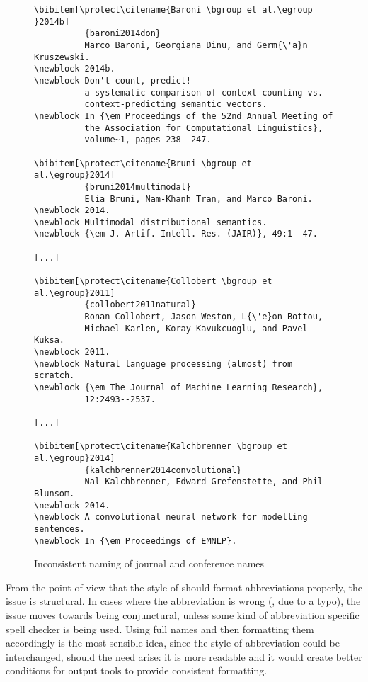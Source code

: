 \begin{figure}
  \centering
\begin{small}
\begin{verbatim}
\bibitem[\protect\citename{Baroni \bgroup et al.\egroup }2014b]
          {baroni2014don}
          Marco Baroni, Georgiana Dinu, and Germ{\'a}n Kruszewski.
\newblock 2014b.
\newblock Don't count, predict!
          a systematic comparison of context-counting vs.
          context-predicting semantic vectors.
\newblock In {\em Proceedings of the 52nd Annual Meeting of
          the Association for Computational Linguistics},
          volume~1, pages 238--247.

\bibitem[\protect\citename{Bruni \bgroup et al.\egroup}2014]
          {bruni2014multimodal}
          Elia Bruni, Nam-Khanh Tran, and Marco Baroni.
\newblock 2014.
\newblock Multimodal distributional semantics.
\newblock {\em J. Artif. Intell. Res. (JAIR)}, 49:1--47.

[...]

\bibitem[\protect\citename{Collobert \bgroup et al.\egroup}2011]
          {collobert2011natural}
          Ronan Collobert, Jason Weston, L{\'e}on Bottou,
          Michael Karlen, Koray Kavukcuoglu, and Pavel Kuksa.
\newblock 2011.
\newblock Natural language processing (almost) from scratch.
\newblock {\em The Journal of Machine Learning Research},
          12:2493--2537.

[...]

\bibitem[\protect\citename{Kalchbrenner \bgroup et al.\egroup}2014]
          {kalchbrenner2014convolutional}
          Nal Kalchbrenner, Edward Grefenstette, and Phil Blunsom.
\newblock 2014.
\newblock A convolutional neural network for modelling sentences.
\newblock In {\em Proceedings of EMNLP}.
\end{verbatim}
\end{small}
  \caption{Inconsistent naming of journal and conference names}
\label{fig:inconsistent_naming}
\end{figure}

From the point of view that the style of {\bibtex} should format
abbreviations properly, the issue is structural.  In cases where the
abbreviation is wrong (\eg, due to a typo), the issue moves towards
being conjunctural, unless some kind of abbreviation specific spell
checker is being used.  Using full names and then formatting them
accordingly is the most sensible idea, since the style of abbreviation
could be interchanged, should the need arise: it is more readable and
it would create better conditions for output tools to provide
consistent formatting.

